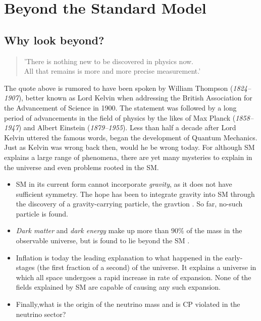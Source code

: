 \section{Beyond the Standard Model}
\subsection{Why look beyond?}
\begin{center}
    \hyphenblockcquote{UKenglish}{Kelvin}{
        'There is nothing new to be discovered in physics now.\\
        All that remains is more and more precise measurement.'
        }
\end{center}
The quote above is rumored to have been spoken by William Thompson (\emph{1824–1907}), better
known as Lord Kelvin when addressing the British Association for the Advancement
of Science in 1900. The statement was followed by a long period of advancements in the
field of physics by the likes of Max Planck (\emph{1858–1947}) and 
Albert Einstein (\emph{1879–1955}). Less than half a decade after Lord Kelvin
uttered the famous words, began the development of Quantum Mechanics. 
Just as Kelvin was wrong back then, would he be wrong today. For although \ac{SM} explains 
a large range of phenomena, there are yet many mysteries to explain in the universe and even 
problems rooted in the \ac{SM}. 
\begin{itemize}
    \item \ac{SM} in its current form cannot incorporate \emph{gravity}, as it does not have sufficient symmetry. 
    The hope has been to integrate gravity into \ac{SM} through the discovery of a gravity-carrying particle, 
    the gravtion \cite{Graviton}. So far, no-such particle is found.
    \item \emph{Dark matter} and \emph{dark energy} make up more than $90\%$ of the mass in the observable universe,
    but is found to lie beyond the \ac{SM} \cite{DarkME}.
    \item Inflation is today the leading explanation to what happened in the early-stages
    (the first fraction of a second) of the universe. It explains a universe in which all space
    undergoes a rapid increase in rate of expansion. None of the fields explained by \ac{SM} are 
    capable of causing any such expansion.
    \item Finally,what is the origin of the neutrino 
    mass and is \ac{CP} violated in the neutrino sector? 
\end{itemize}
